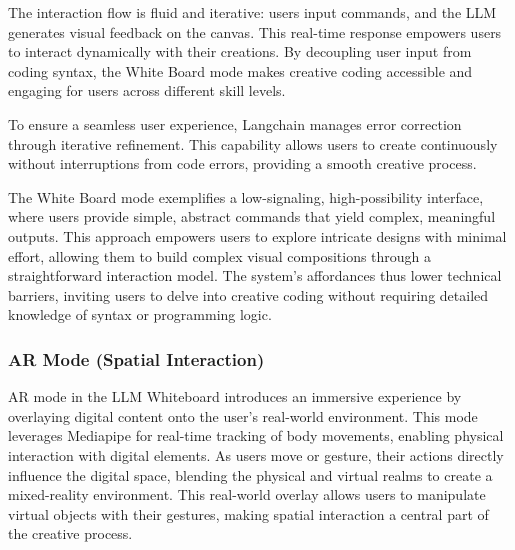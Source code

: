 The interaction flow is fluid and iterative: users input commands, and the LLM generates visual feedback on the canvas.
This real-time response empowers users to interact dynamically with their creations.%
By decoupling user input from coding syntax, the White Board mode makes creative coding accessible and engaging for users across different skill levels.

To ensure a seamless user experience, Langchain manages error correction through iterative refinement.
This capability allows users to create continuously without interruptions from code errors, providing a smooth creative process.

The White Board mode exemplifies a low-signaling, high-possibility interface, where users provide simple, abstract commands that yield complex, meaningful outputs.
This approach empowers users to explore intricate designs with minimal effort, allowing them to build complex visual compositions through a straightforward interaction model.
The system’s affordances thus lower technical barriers, inviting users to delve into creative coding without requiring detailed knowledge of syntax or programming logic.

\subsubsection{AR Mode (Spatial Interaction)}

AR mode in the LLM Whiteboard introduces an immersive experience by overlaying digital content onto the user’s real-world environment.
This mode leverages Mediapipe for real-time tracking of body movements, enabling physical interaction with digital elements.
As users move or gesture, their actions directly influence the digital space, blending the physical and virtual realms to create a mixed-reality environment.
This real-world overlay allows users to manipulate virtual objects with their gestures, making spatial interaction a central part of the creative process.

